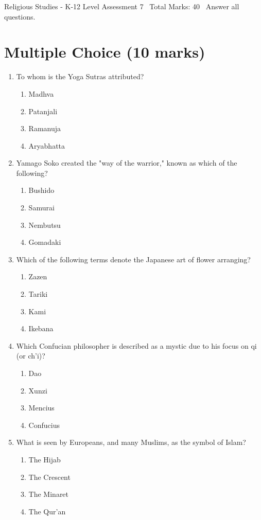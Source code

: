 \documentclass[12pt]{article}
\begin{document}
\begin{center}
Religious Studies - K-12 Level Assessment 7 \
Total Marks: 40 \
Answer all questions.
\end{center}

\section*{Multiple Choice (10 marks)}
\begin{enumerate}[label=\arabic*.]
\item To whom is the Yoga Sutras attributed?
\begin{enumerate}[label=(\alph*)]
    \item Madhva
    \item Patanjali
    \item Ramanuja
    \item Aryabhatta
\end{enumerate}
\item Yamago Soko created the "way of the warrior," known as which of the following?
\begin{enumerate}[label=(\alph*)]
    \item Bushido
    \item Samurai
    \item Nembutsu
    \item Gomadaki
\end{enumerate}
\item Which of the following terms denote the Japanese art of flower arranging?
\begin{enumerate}[label=(\alph*)]
    \item Zazen
    \item Tariki
    \item Kami
    \item Ikebana
\end{enumerate}
\item Which Confucian philosopher is described as a mystic due to his focus on qi (or ch'i)?
\begin{enumerate}[label=(\alph*)]
    \item Dao
    \item Xunzi
    \item Mencius
    \item Confucius
\end{enumerate}
\item What is seen by Europeans, and many Muslims, as the symbol of Islam?
\begin{enumerate}[label=(\alph*)]
    \item The Hijab
    \item The Crescent
    \item The Minaret
    \item The Qur'an
\end{enumerate}
\end{enumerate}
\end{document}
